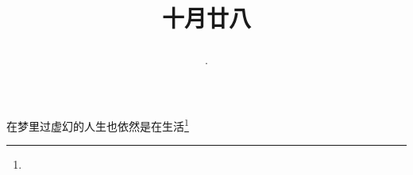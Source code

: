 \title{\date[d=28,m=11,y=2024][year:cn-y,年,month:cn,day:cn,日,·,weekday]·十月廿八 }
在梦里过虚幻的人生也依然是在生活\footnote{ }

